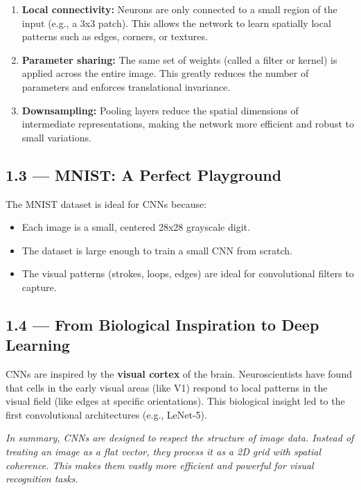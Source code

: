 \documentclass[11pt]{article}
\begin{document}
\begin{enumerate}
    \item \textbf{Local connectivity:} Neurons are only connected to a small region of the input (e.g., a 3x3 patch). This allows the network to learn spatially local patterns such as edges, corners, or textures.
    \item \textbf{Parameter sharing:} The same set of weights (called a filter or kernel) is applied across the entire image. This greatly reduces the number of parameters and enforces translational invariance.
    \item \textbf{Downsampling:} Pooling layers reduce the spatial dimensions of intermediate representations, making the network more efficient and robust to small variations.
\end{enumerate}

\subsection*{\textbf{1.3 — MNIST: A Perfect Playground}}

The MNIST dataset is ideal for CNNs because:
\begin{itemize}
    \item Each image is a small, centered 28x28 grayscale digit.
    \item The dataset is large enough to train a small CNN from scratch.
    \item The visual patterns (strokes, loops, edges) are ideal for convolutional filters to capture.
\end{itemize}

\subsection*{\textbf{1.4 — From Biological Inspiration to Deep Learning}}

CNNs are inspired by the \textbf{visual cortex} of the brain. Neuroscientists have found that cells in the early visual areas (like V1) respond to local patterns in the visual field (like edges at specific orientations). This biological insight led to the first convolutional architectures (e.g., LeNet-5).

\vspace{1em}
\noindent\textit{In summary, CNNs are designed to respect the structure of image data. Instead of treating an image as a flat vector, they process it as a 2D grid with spatial coherence. This makes them vastly more efficient and powerful for visual recognition tasks.}
\end{document}
